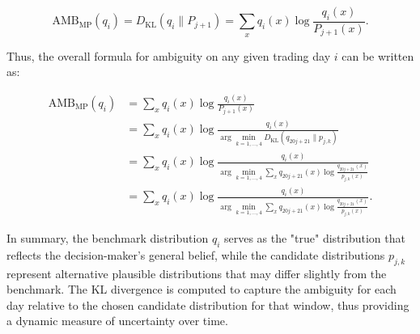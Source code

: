\documentclass[preprint,12pt,authoryear]{elsarticle}
\begin{document}
\[
\mathrm{AMB}_{\mathrm{MP}}(q_i) =  D_{\mathrm{KL}}(q_i \parallel P_{j+1}) = \sum_{x} q_i(x) \log \frac{q_i(x)}{P_{j+1}(x)}.
\]

Thus, the overall formula for ambiguity on any given trading day \(i\) can be written as:

\[
\begin{aligned}
\mathrm{AMB}_{\mathrm{MP}}(q_i) &= \sum_{x} q_i(x) \log \frac{q_i(x)}{P_{j+1}(x)} \\
&= \sum_{x} q_i(x) \log \frac{q_i(x)}{\arg\min_{k=1,\dots,4} D_{\mathrm{KL}}(q_{20j+21} \parallel p_{j,k})} \\
&= \sum_{x} q_i(x) \log \frac{q_i(x)}{\arg\min_{k=1,\dots,4} \sum_{x} q_{20j+21}(x) \log \frac{q_{20j+21}(x)}{p_{j,k}(x)}} \\
&= \sum_{x} q_i(x) \log \frac{q_i(x)}{\arg\min_{k=1,\dots,4} \sum_{x} q_{20j+21}(x) \log \frac{q_{20j+21}(x)}{p_{j,k}(x)}}.
\end{aligned}
\]

In summary, the benchmark distribution \(q_i\) serves as the "true" distribution that reflects the decision-maker's general belief, while the candidate distributions \(p_{j,k}\) represent alternative plausible distributions that may differ slightly from the benchmark. The KL divergence is computed to capture the ambiguity for each day relative to the chosen candidate distribution for that window, thus providing a dynamic measure of uncertainty over time.
\end{document}
